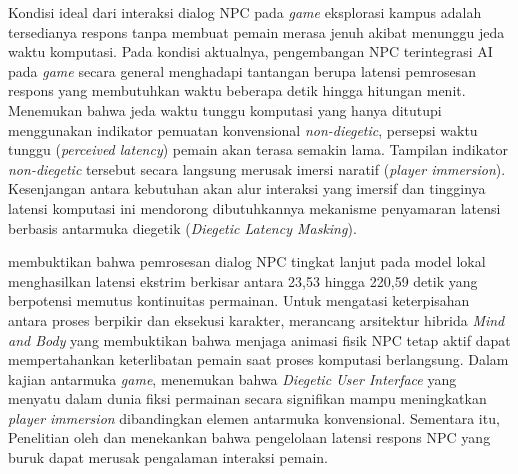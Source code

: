 Kondisi ideal dari interaksi dialog NPC pada \textit{game} eksplorasi kampus adalah tersedianya respons tanpa membuat pemain merasa jenuh akibat menunggu jeda waktu komputasi. Pada kondisi aktualnya, pengembangan NPC terintegrasi AI pada \textit{game} secara general menghadapi tantangan berupa latensi pemrosesan respons yang membutuhkan waktu beberapa detik hingga hitungan menit. \citet{elfleet2024investigating} Menemukan bahwa jeda waktu tunggu komputasi yang hanya ditutupi menggunakan indikator pemuatan konvensional \textit{non-diegetic}, persepsi waktu tunggu (\textit{perceived latency}) pemain akan terasa semakin lama. Tampilan indikator \textit{non-diegetic} tersebut secara langsung merusak imersi naratif (\textit{player immersion}). Kesenjangan antara kebutuhan akan alur interaksi yang imersif dan tingginya latensi komputasi ini mendorong dibutuhkannya mekanisme penyamaran latensi berbasis antarmuka diegetik (\textit{Diegetic Latency Masking}).

\citet{siahaan2026retrieval} membuktikan bahwa pemrosesan dialog NPC tingkat lanjut pada model lokal menghasilkan latensi ekstrim berkisar antara 23,53 hingga 220,59 detik yang berpotensi memutus kontinuitas permainan. Untuk mengatasi keterpisahan antara proses berpikir dan eksekusi karakter, \citet{wei2025mind} merancang arsitektur hibrida \textit{Mind and Body} yang membuktikan bahwa menjaga animasi fisik NPC tetap aktif dapat mempertahankan keterlibatan pemain saat proses komputasi berlangsung. Dalam kajian antarmuka \textit{game}, \citet{andersson2024effects} menemukan bahwa \textit{Diegetic User Interface} yang menyatu dalam dunia fiksi permainan secara signifikan mampu meningkatkan \textit{player immersion} dibandingkan elemen antarmuka konvensional. Sementara itu, Penelitian oleh \citet{csepregi2021effect} dan \citet{elfleet2024investigating} menekankan bahwa pengelolaan latensi respons NPC yang buruk dapat merusak pengalaman interaksi pemain.

